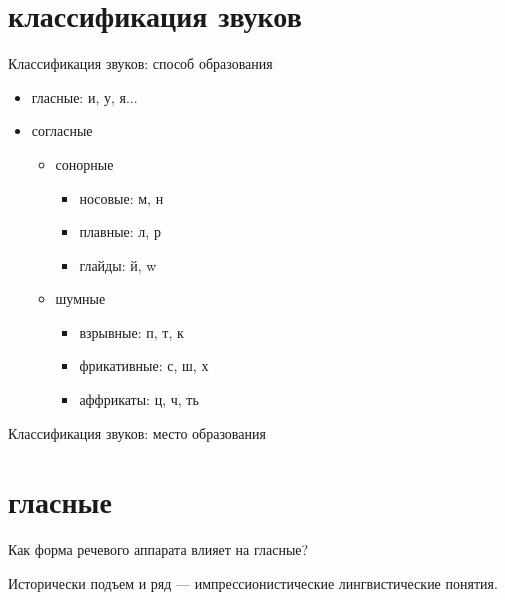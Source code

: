 \section{классификация звуков}
\begin{frame}{Классификация звуков:  способ образования}
\begin{itemize}
\item гласные: и, у, я...
\item согласные
\begin{itemize}
\item сонорные
\begin{itemize}
\item носовые: м, н
\item плавные: л, р
\item глайды: й, w
\end{itemize}
\item шумные
\begin{itemize}
\item взрывные: п, т, к
\item фрикативные: с, ш, х
\item аффрикаты: ц, ч, ть
\end{itemize}
\end{itemize}
\end{itemize}
\end{frame}


\begin{frame}{Классификация звуков:  место образования}

\end{frame}

\section{гласные}
\begin{frame}{Как форма речевого аппарата влияет на гласные?}
\Large
\vfill
\begin{center}
\begin{vowel}
\end{vowel}
\end{center}
\vfill
\normalsize
Исторически подъем и ряд --- импрессионистические лингвистические понятия.
\end{frame}

